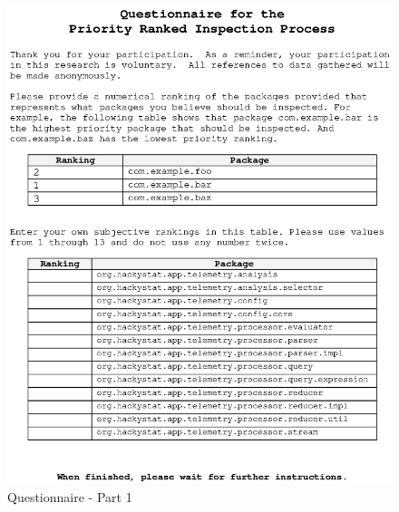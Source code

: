 \begin{figure}[htbp]
  \centering
  \includegraphics[width=1.0\textwidth]{figs/hackyTelemetry-questionnaire-shrunk_1.eps}
  \caption{Questionnaire - Part 1}
  \label{fig:questionnaire1}
\end{figure}

